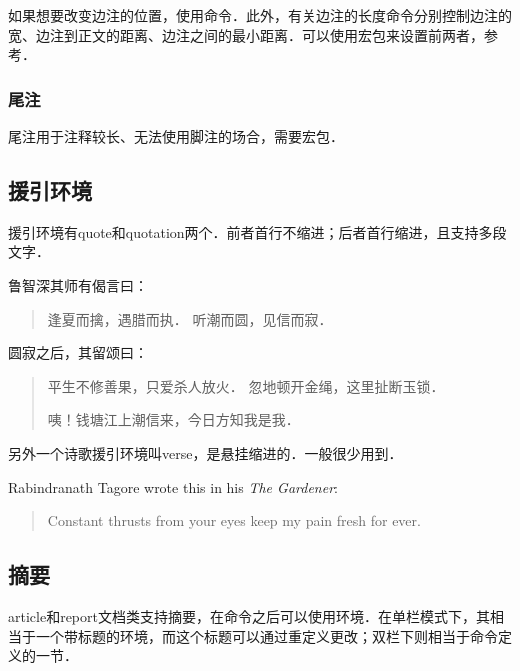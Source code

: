 如果想要改变边注的位置，使用命令．此外，有关边注的长度命令分别控制边注的宽、边注到正文的距离、边注之间的最小距离．可以使用宏包来设置前两者，参考．

\subsubsection{尾注}
尾注用于注释较长、无法使用脚注的场合，需要宏包．

\subsection{援引环境}
援引环境有quote和quotation两个．前者首行不缩进；后者首行缩进，且支持多段文字．

\begin{codeshow}
鲁智深其师有偈言曰：
\begin{quote}
逢夏而擒，遇腊而执．
听潮而圆，见信而寂．
\end{quote}
圆寂之后，其留颂曰：
\begin{quotation}
平生不修善果，只爱杀人放火．
忽地顿开金绳，这里扯断玉锁．

咦！钱塘江上潮信来，今日方知我是我．
\end{quotation}
\end{codeshow}

另外一个诗歌援引环境叫verse，\label{envi:verse}是悬挂缩进的．一般很少用到．

\begin{codeshow}
Rabindranath Tagore wrote this in 
his \emph{The Gardener}: 
\begin{verse}
Constant thrusts from your eyes
keep my pain fresh for ever.
\end{verse}
\end{codeshow}

\subsection{摘要}
article和report文档类支持摘要，在命令之后可以使用环境．在单栏模式下，其相当于一个带标题的环境，而这个标题可以通过重定义更改；双栏下则相当于命令定义的一节．

